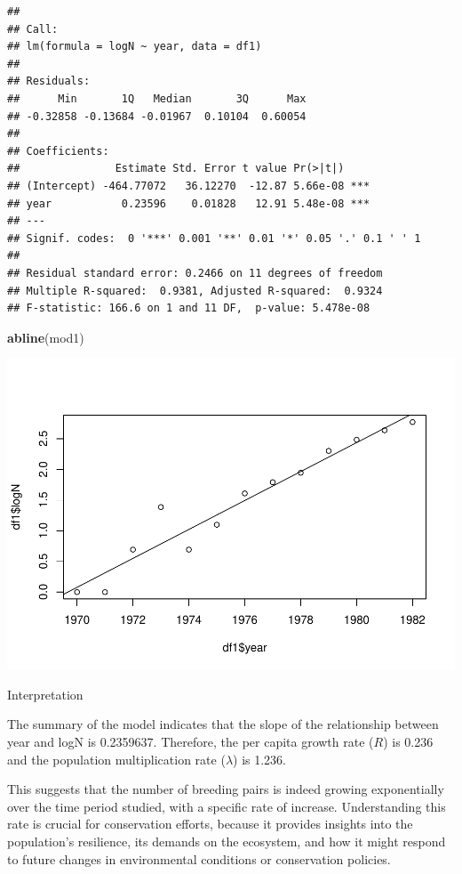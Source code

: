 \documentclass[
  a4paper]{book}
\newenvironment{Shaded}{\begin{snugshade}}{\end{snugshade}}
\newcommand{\FunctionTok}[1]{\textcolor[rgb]{0.13,0.29,0.53}{\textbf{#1}}}
\newcommand{\NormalTok}[1]{#1}
\begin{document}
\begin{verbatim}
## 
## Call:
## lm(formula = logN ~ year, data = df1)
## 
## Residuals:
##      Min       1Q   Median       3Q      Max 
## -0.32858 -0.13684 -0.01967  0.10104  0.60054 
## 
## Coefficients:
##               Estimate Std. Error t value Pr(>|t|)    
## (Intercept) -464.77072   36.12270  -12.87 5.66e-08 ***
## year           0.23596    0.01828   12.91 5.48e-08 ***
## ---
## Signif. codes:  0 '***' 0.001 '**' 0.01 '*' 0.05 '.' 0.1 ' ' 1
## 
## Residual standard error: 0.2466 on 11 degrees of freedom
## Multiple R-squared:  0.9381, Adjusted R-squared:  0.9324 
## F-statistic: 166.6 on 1 and 11 DF,  p-value: 5.478e-08
\end{verbatim}

\begin{Shaded}
\begin{Highlighting}[]
\FunctionTok{abline}\NormalTok{(mod1)}
\end{Highlighting}
\end{Shaded}

\includegraphics{BB512_files/figure-latex/plotproj2-1.pdf}

Interpretation

The summary of the model indicates that the slope of the relationship between year and logN is 0.2359637. Therefore, the per capita growth rate (\(R\)) is 0.236 and the population multiplication rate (\(\lambda\)) is 1.236.

This suggests that the number of breeding pairs is indeed growing exponentially over the time period studied, with a specific rate of increase. Understanding this rate is crucial for conservation efforts, because it provides insights into the population's resilience, its demands on the ecosystem, and how it might respond to future changes in environmental conditions or conservation policies.
\end{document}
